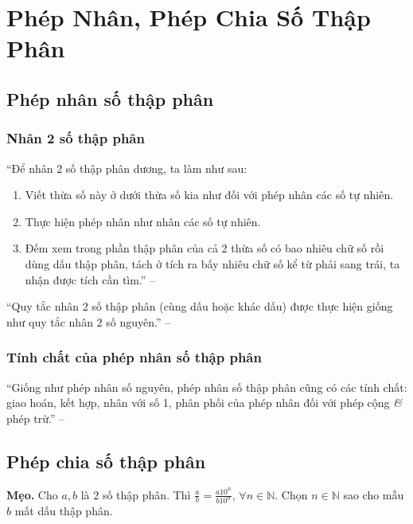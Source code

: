 \documentclass[oneside]{book}
\numberwithin{equation}{section}
\begin{document}

\section{Phép Nhân, Phép Chia Số Thập Phân}

\subsection{Phép nhân số thập phân}

\subsubsection{Nhân 2 số thập phân}
``Để nhân 2 số thập phân dương, ta làm như sau:
\begin{enumerate}
	\item Viết thừa số này ở dưới thừa số kia như đối với phép nhân các số tự nhiên.
	\item Thực hiện phép nhân như nhân các số tự nhiên.
	\item Đếm xem trong phần thập phân của cả 2 thừa số có bao nhiêu chữ số rồi dùng dấu thập phân, tách ở tích ra bấy nhiêu chữ số kể từ phải sang trái, ta nhận được tích cần tìm.'' -- \cite[p. 52]{Thai_Anh_Dat_Ha_Loan_Nam_Quang_Toan_6_tap_2}
\end{enumerate}
``Quy tắc nhân 2 số thập phân (cùng dấu hoặc khác dấu) được thực hiện giống như quy tắc nhân 2 số nguyên.'' -- \cite[p. 52]{Thai_Anh_Dat_Ha_Loan_Nam_Quang_Toan_6_tap_2}

\subsubsection{Tính chất của phép nhân số thập phân}
``Giống như phép nhân số nguyên, phép nhân số thập phân cũng có các tính chất: giao hoán, kết hợp, nhân với số 1, phân phối của phép nhân đối với phép cộng \textit{\&} phép trừ.'' -- \cite[p. 53]{Thai_Anh_Dat_Ha_Loan_Nam_Quang_Toan_6_tap_2}

\subsection{Phép chia số thập phân}
\textbf{Mẹo.} Cho $a,b$ là 2 số thập phân. Thì $\frac{a}{b} = \frac{a10^n}{b10^n}$, $\forall n\in\mathbb{N}$. Chọn $n\in\mathbb{N}$ sao cho mẫu $b$ mất dấu thập phân.
\end{document}
